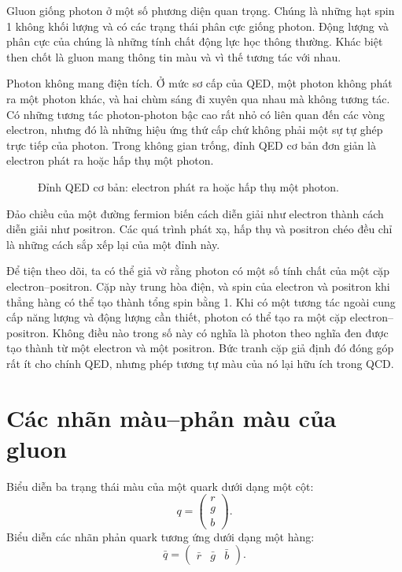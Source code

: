 Gluon giống photon ở một số phương diện quan trọng. Chúng là những hạt spin 1 không khối lượng và có các trạng thái phân cực giống photon. Động lượng và phân cực của chúng là những tính chất động lực học thông thường. Khác biệt then chốt là gluon mang thông tin màu và vì thế tương tác với nhau.

Photon không mang điện tích. Ở mức sơ cấp của QED, một photon không phát ra một photon khác, và hai chùm sáng đi xuyên qua nhau mà không tương tác. Có những tương tác photon-photon bậc cao rất nhỏ có liên quan đến các vòng electron, nhưng đó là những hiệu ứng thứ cấp chứ không phải một sự tự ghép trực tiếp của photon. Trong không gian trống, đỉnh QED cơ bản đơn giản là electron phát ra hoặc hấp thụ một photon.

\begin{figure}[h]
\centering
{}
\caption{Đỉnh QED cơ bản: electron phát ra hoặc hấp thụ một photon.}
\end{figure}

Đảo chiều của một đường fermion biến cách diễn giải như electron thành cách diễn giải như positron. Các quá trình phát xạ, hấp thụ và positron chéo đều chỉ là những cách sắp xếp lại của một đỉnh này.

Để tiện theo dõi, ta có thể giả vờ rằng photon có một số tính chất của một cặp electron--positron. Cặp này trung hòa điện, và spin của electron và positron khi thẳng hàng có thể tạo thành tổng spin bằng 1. Khi có một tương tác ngoài cung cấp năng lượng và động lượng cần thiết, photon có thể tạo ra một cặp electron--positron. Không điều nào trong số này có nghĩa là photon theo nghĩa đen được tạo thành từ một electron và một positron. Bức tranh cặp giả định đó đóng góp rất ít cho chính QED, nhưng phép tương tự màu của nó lại hữu ích trong QCD.

\section{Các nhãn màu--phản màu của gluon}

Biểu diễn ba trạng thái màu của một quark dưới dạng một cột:
\begin{equation}
q=
\begin{pmatrix}
r\\
g\\
b
\end{pmatrix}.
\end{equation}
Biểu diễn các nhãn phản quark tương ứng dưới dạng một hàng:
\begin{equation}
\bar q=
\begin{pmatrix}
\bar r&\bar g&\bar b
\end{pmatrix}.
\end{equation}

